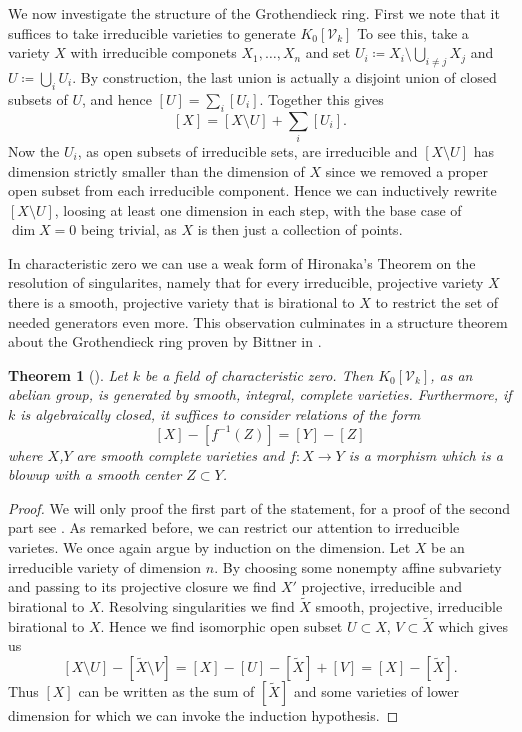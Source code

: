 \documentclass[11pt, a4paper, german]{article}
\theoremstyle{plain}
\newtheorem{theorem}{Theorem}[section]
\theoremstyle{definition}
\newcommand{\gring}[1][k]{K_0[\mathcal{V}_#1]}
\begin{document}

We now investigate the structure of the Grothendieck ring. First we note that it suffices to take irreducible varieties to generate $\gring[k]$
To see this, take a variety $X$ with irreducible componets $X_1, \dots, X_n$ and set ${U_i \coloneqq X_i \setminus \bigcup_{i \neq j} X_j}$ and
$U \coloneqq \bigcup_i U_i$. By construction, the last union is actually a disjoint union of closed subsets of $U$, 
and hence $[U] = \sum_i [U_i]$. Together this gives
\[
    [X] = [X \setminus U] + \sum_i [U_i].
\] Now the $U_i$, as open subsets of irreducible sets, are irreducible and $[X \setminus U]$ has dimension
strictly smaller than the dimension of $X$ since we removed a proper open subset from each irreducible component. Hence we can inductively
rewrite $[X \setminus U]$, loosing at least one dimension in each step, with the base case of $\dim  X = 0$ being trivial, as $X$ is then
just a collection of points.

In characteristic zero we can use a weak form of Hironaka's Theorem on the resolution of singularites, namely that for every irreducible, 
projective variety $X$ there is a smooth, projective variety that is birational to $X$ to restrict the set of needed generators even more. 
This observation culminates in a structure theorem about the Grothendieck ring proven by Bittner in \cite{Bittner}.


\begin{theorem}[{\cite[Thm. 3.1]{Bittner}}]
    \label{bittner}
    Let $k$ be a field of characteristic zero. Then $\gring[k]$, as an abelian group, is generated by smooth, integral, complete varieties.
    Furthermore, if $k$ is algebraically closed, it suffices to consider relations of the form
    \[
        [X] - [f^{-1}(Z)] = [Y] - [Z]
    \]
    where $X$,$Y$ are smooth complete varieties and $f \colon X \to Y$ is a morphism which is a blowup with a smooth center $Z \subset Y$.     
\end{theorem}
\begin{proof}
    We will only proof the first part of the statement, for a proof of the second part see \cite{Bittner}. As remarked before, we can restrict our 
    attention to irreducible varietes.  We once again argue by induction on the dimension.
    Let $X$ be an irreducible variety of dimension $n$. By choosing some nonempty affine subvariety and passing to its projective closure we
    find $X'$ projective, irreducible and birational to $X$. Resolving singularities we find $\widetilde{X}$ smooth, projective, irreducible
    birational to $X$. Hence we find isomorphic open subset $U \subset X$, $V \subset \widetilde{X}$ which gives us
    \[
        [X \setminus U ] - [\widetilde{X} \setminus V] = [X] - [U] - [\widetilde{X}] + [V] = [X] - [\widetilde{X}].
    \]
    Thus $[X]$ can be written as the sum of $[\widetilde{X}]$ and some varieties of lower dimension for which we can invoke the induction
    hypothesis.
\end{proof}
\end{document}
